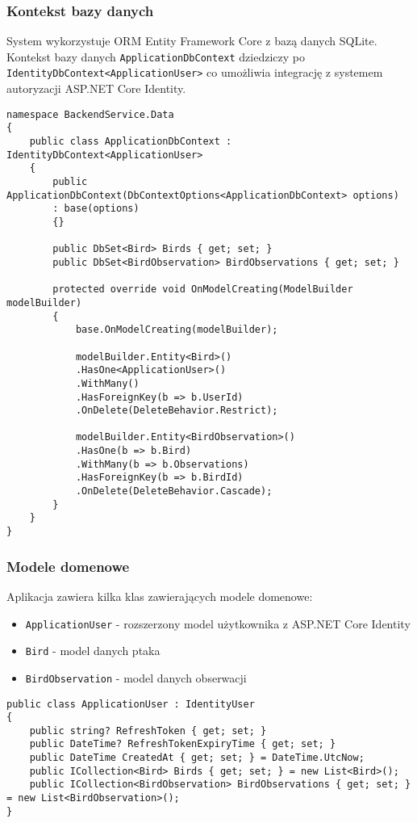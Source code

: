 \subsubsection{Kontekst bazy danych}
System wykorzystuje ORM Entity Framework Core z bazą danych SQLite. Kontekst bazy danych \texttt{ApplicationDbContext} dziedziczy po \texttt{IdentityDbContext<ApplicationUser>} co umożliwia integrację z systemem autoryzacji ASP.NET Core Identity.

\begin{lstlisting}[style=csharp, caption={Implementacja ApplicationDbContext}]
namespace BackendService.Data
{
	public class ApplicationDbContext : IdentityDbContext<ApplicationUser>
	{
		public ApplicationDbContext(DbContextOptions<ApplicationDbContext> options)
		: base(options)
		{}
		
		public DbSet<Bird> Birds { get; set; }
		public DbSet<BirdObservation> BirdObservations { get; set; }
		
		protected override void OnModelCreating(ModelBuilder modelBuilder)
		{
			base.OnModelCreating(modelBuilder);
			
			modelBuilder.Entity<Bird>()
			.HasOne<ApplicationUser>()
			.WithMany()
			.HasForeignKey(b => b.UserId)
			.OnDelete(DeleteBehavior.Restrict);
			
			modelBuilder.Entity<BirdObservation>()
			.HasOne(b => b.Bird)
			.WithMany(b => b.Observations)
			.HasForeignKey(b => b.BirdId)
			.OnDelete(DeleteBehavior.Cascade);
		}
	}
}
\end{lstlisting}

\subsubsection{Modele domenowe}
Aplikacja zawiera kilka klas zawierających modele domenowe:
\begin{itemize}
	\item \texttt{ApplicationUser} - rozszerzony model użytkownika z ASP.NET Core Identity
	\item \texttt{Bird} - model danych ptaka
	\item \texttt{BirdObservation} - model danych obserwacji
\end{itemize}

\begin{lstlisting}[style=csharp, caption={Implementacja ApplicationUser}]
public class ApplicationUser : IdentityUser
{
	public string? RefreshToken { get; set; }
	public DateTime? RefreshTokenExpiryTime { get; set; }
	public DateTime CreatedAt { get; set; } = DateTime.UtcNow;
	public ICollection<Bird> Birds { get; set; } = new List<Bird>();
	public ICollection<BirdObservation> BirdObservations { get; set; } = new List<BirdObservation>();
}
\end{lstlisting}

